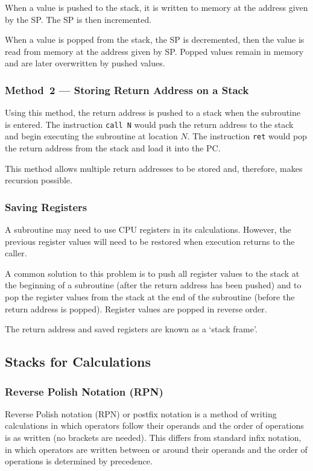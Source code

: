 When a value is pushed to the stack, it is written to memory at the address given by the SP\@.
The SP is then incremented.

When a value is popped from the stack, the SP is decremented, then the value is read from memory at the address given by SP\@.
Popped values remain in memory and are later overwritten by pushed values.

\subsubsection{Method~2 --- Storing Return Address on a Stack}

Using this method, the return address is pushed to a stack when the subroutine is entered.
The instruction \texttt{call N} would push the return address to the stack and begin executing the subroutine at location \( N \).
The instruction \texttt{ret} would pop the return address from the stack and load it into the PC.

This method allows multiple return addresses to be stored and, therefore, makes recursion possible.

\subsubsection{Saving Registers}

A subroutine may need to use CPU registers in its calculations.
However, the previous register values will need to be restored when execution returns to the caller.

A common solution to this problem is to push all register values to the stack at the beginning of a subroutine (after the return address has been pushed) and to pop the register values from the stack at the end of the subroutine (before the return address is popped).
Register values are popped in reverse order.

The return address and saved registers are known as a `stack frame'.

\subsection{Stacks for Calculations}

\subsubsection{Reverse Polish Notation (RPN)}

Reverse Polish notation (RPN) or postfix notation is a method of writing calculations in which operators follow their operands and the order of operations is as written (no brackets are needed).
This differs from standard infix notation, in which operators are written between or around their operands and the order of operations is determined by precedence.

